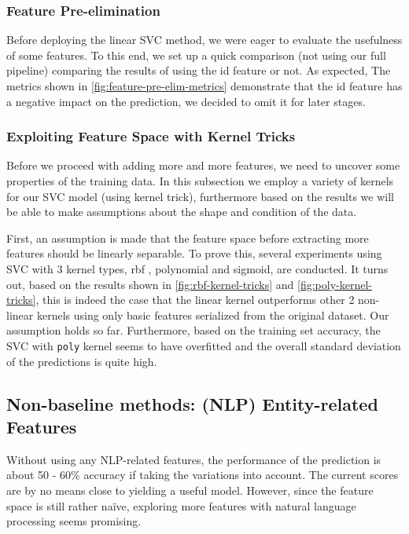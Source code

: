 \subsubsection{Feature Pre-elimination}

Before deploying the linear SVC method, we were eager to evaluate the usefulness of some features.
To this end, we set up a quick comparison (not using our full pipeline) comparing the results of using the id feature or not.
As expected, The metrics shown in \autoref{fig:feature-pre-elim-metrics} demonstrate that the id feature has a negative impact on the prediction, we decided to omit it for later stages.

\subsubsection{Exploiting Feature Space with Kernel Tricks}

Before we proceed with adding more and more features, we need to uncover some properties of the training data.
In this subsection we employ a variety of kernels for our SVC model (using kernel trick), furthermore based on the results we will be able to make assumptions about the shape and condition of the data.


First, an assumption is made that the feature space before extracting more features should be linearly separable.
To prove this, several experiments using SVC with 3 kernel types, rbf \cite{x1}, polynomial and sigmoid, are conducted.
It turns out, based on the results shown in \autoref{fig:rbf-kernel-tricks} and \autoref{fig:poly-kernel-tricks}, this is indeed the case that the linear kernel outperforms other 2 non-linear kernels using only basic features serialized from the original dataset.
Our assumption holds so far.
Furthermore, based on the training set accuracy, the SVC with \verb|poly| kernel seems to have overfitted and the overall standard deviation of the predictions is quite high.

\subsection{Non-baseline methods: (NLP) Entity-related Features}

Without using any NLP-related features, the performance of the prediction is about 50 - 60\% accuracy if taking the variations into account. The current scores are by no means close to yielding a useful model. However, since the feature space is still rather naïve, exploring more features with natural language processing seems promising.

